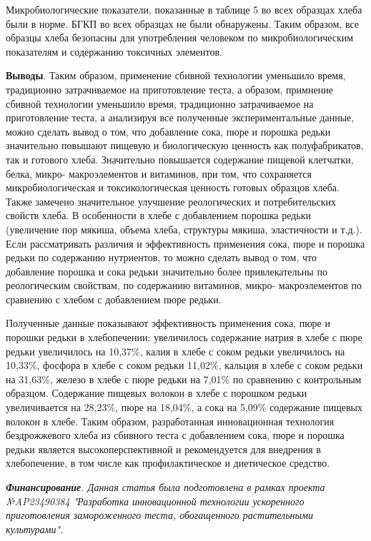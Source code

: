 \begin{multicols}{2}
Микробиологические показатели, показанные в таблице 5 во всех образцах
хлеба были в норме. БГКП во всех образцах не были обнаружены. Таким
образом, все образцы хлеба безопасны для употребления человеком по
микробиологическим показателям и содержанию токсичных элементов.

{\bfseries Выводы}. Таким образом, применение сбивной технологии уменьшило
время, традиционно затрачиваемое на приготовление теста, а образом,
примнение сбивной технологии уменьшило время, традиционно затрачиваемое
на приготовление теста, а анализируя все полученные экспериментальные
данные, можно сделать вывод о том, что добавление сока, пюре и порошка
редьки значительно повышают пищевую и биологическую ценность как
полуфабрикатов, так и готового хлеба. Значительно повышается содержание
пищевой клетчатки, белка, микро- макроэлементов и витаминов, при том,
что сохраняется микробиологическая и токсикологическая ценность готовых
образцов хлеба. Также замечено значительное улучшение реологических и
потребительских свойств хлеба. В особенности в хлебе с добавлением
порошка редьки (увеличение пор мякиша, объема хлеба, структуры мякиша,
эластичности и т.д.). Если рассматривать различия и эффективность
применения сока, пюре и порошка редьки по содержанию нутриентов, то
можно сделать вывод о том, что добавление порошка и сока редьки
значительно более привлекательны по реологическим свойствам, по
содержанию витаминов, микро- макроэлементов по сравнению с хлебом с
добавлением пюре редьки.

Полученные данные показывают эффективность применения сока, пюре и
порошки редьки в хлебопечении: увеличилось содержание натрия в хлебе с
пюре редьки увеличилось на 10,37\%, калия в хлебе с соком редьки
увеличилось на 10,33\%, фосфора в хлебе с соком редьки 11,02\%, кальция
в хлебе с соком редьки на 31,63\%, железо в хлебе с пюре редьки на
7,01\% по сравнению с контрольным образцом. Содержание пищевых волокон в
хлебе с порошком редьки увеличивается на 28,23\%, пюре на 18,04\%, а
сока на 5,09\% содержание пищевых волокон в хлебе. Таким образом,
разработанная инновационная технология бездрожжевого хлеба из сбивного
теста с добавлением сока, пюре и порошка редьки является
высокоперспективной и рекомендуется для внедрения в хлебопечение, в том
числе как профилактическое и диетическое средство.

\emph{{\bfseries Финансирование}. Данная статья была подготовлена в рамках
проекта №AP23490384 "Разработка инновационной технологии ускоренного
приготовления замороженного теста, обогащенного растительными
культурами".}
\end{multicols}

